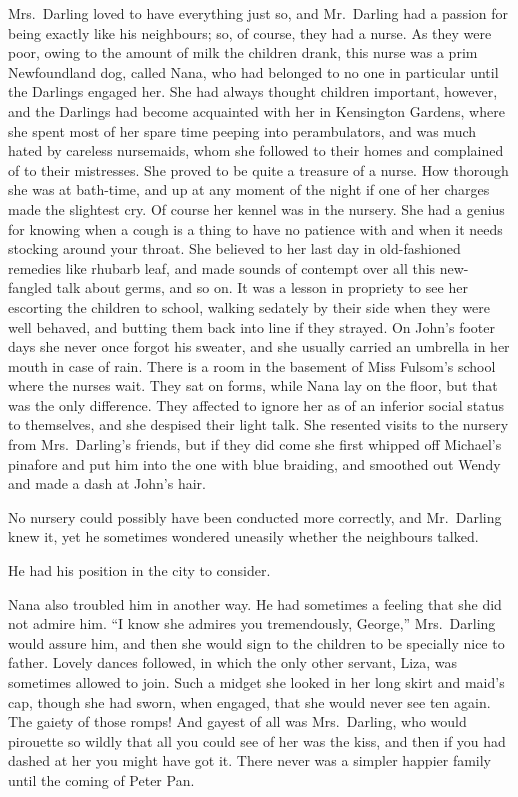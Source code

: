 Mrs.\ Darling loved to have everything just so, and Mr.\ Darling had a passion
for being exactly like his neighbours; so, of course, they had a nurse. As they
were poor, owing to the amount of milk the children drank, this nurse was a prim
Newfoundland dog, called Nana, who had belonged to no one in particular until
the Darlings engaged her. She had always thought children important, however,
and the Darlings had become acquainted with her in Kensington Gardens, where she
spent most of her spare time peeping into perambulators, and was much hated by
careless nursemaids, whom she followed to their homes and complained of to their
mistresses. She proved to be quite a treasure of a nurse. How thorough she was
at bath-time, and up at any moment of the night if one of her charges made the
slightest cry. Of course her kennel was in the nursery. She had a genius for
knowing when a cough is a thing to have no patience with and when it needs
stocking around your throat. She believed to her last day in old-fashioned
remedies like rhubarb leaf, and made sounds of contempt over all this
new-fangled talk about germs, and so on. It was a lesson in propriety to see her
escorting the children to school, walking sedately by their side when they were
well behaved, and butting them back into line if they strayed. On John's footer
days she never once forgot his sweater, and she usually carried an umbrella in
her mouth in case of rain. There is a room in the basement of Miss Fulsom's
school where the nurses wait. They sat on forms, while Nana lay on the floor,
but that was the only difference. They affected to ignore her as of an inferior
social status to themselves, and she despised their light talk. She resented
visits to the nursery from Mrs.\ Darling's friends, but if they did come she
first whipped off Michael's pinafore and put him into the one with blue
braiding, and smoothed out Wendy and made a dash at John's hair.

No nursery could possibly have been conducted more correctly, and Mr.\ Darling
knew it, yet he sometimes wondered uneasily whether the neighbours talked.

He had his position in the city to consider.

Nana also troubled him in another way. He had sometimes a feeling that she did
not admire him. ``I know she admires you tremendously, George,'' Mrs.\ Darling
would assure him, and then she would sign to the children to be specially nice
to father. Lovely dances followed, in which the only other servant, Liza, was
sometimes allowed to join. Such a midget she looked in her long skirt and maid's
cap, though she had sworn, when engaged, that she would never see ten again. The
gaiety of those romps! And gayest of all was Mrs.\ Darling, who would pirouette
so wildly that all you could see of her was the kiss, and then if you had dashed
at her you might have got it. There never was a simpler happier family until the
coming of Peter Pan.

